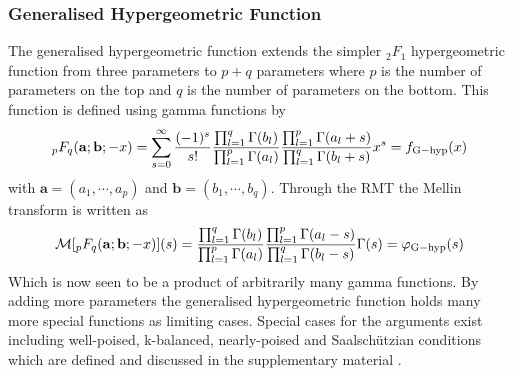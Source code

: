 \documentclass[journal=jcisd8,manuscript=article,layout=onecolumn,pdftex,floatfix,amsmath,amssymb,10pt]{achemso}
\begin{document}
\subsubsection{Generalised Hypergeometric Function}
The generalised hypergeometric function extends the simpler $_2F_1$ hypergeometric function from three parameters to $p+q$ parameters where $p$ is the number of parameters on the top and $q$ is the number of parameters on the bottom. This function is defined using gamma functions by
\begin{equation}
_pF_q(\mathbf{a};\mathbf{b};-x) = \sum_{s=0}^\infty \frac{(-1)^s}{s!} \frac{\prod_{l=1}^q \Gamma(b_l)}{\prod_{l=1}^p \Gamma(a_l)}\frac{\prod_{l=1}^p \Gamma(a_l+s)}{\prod_{l=1}^q \Gamma(b_l+s)} x^s = f_{\rm G-hyp}(x)
\end{equation}
with $\mathbf{a}=(a_1,\cdots,a_p)$ and $\mathbf{b} = (b_1,\cdots,b_q)$. Through the RMT the Mellin transform is written as
\begin{equation}
\mathcal{M}[_pF_q(\mathbf{a};\mathbf{b};-x)](s) = \frac{\prod_{l=1}^q \Gamma(b_l)}{\prod_{l=1}^p \Gamma(a_l)}\frac{\prod_{l=1}^p \Gamma(a_l-s)}{\prod_{l=1}^q \Gamma(b_l-s)} \Gamma(s) = \varphi_{\rm G-hyp}(s)
\end{equation}
Which is now seen to be a product of arbitrarily many gamma functions. By adding more parameters the generalised hypergeometric function holds many more special functions as limiting cases. Special cases for the arguments exist including {\color{red} well-poised, k-balanced, nearly-poised and Saalsch\"utzian} conditions which are defined and discussed in the supplementary material \cite{}.
\end{document}
